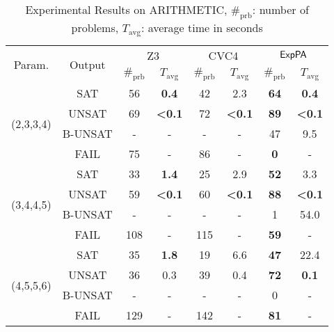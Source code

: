 
\begin{table*}[ht]
        \caption{Experimental Results on ARITHMETIC, 
    $\#_{\mathrm{prb}}$: number of problems, $T_{\mathrm{avg}}$: average time in seconds}
    \centering
    \renewcommand{\arraystretch}{1.2}
    \begin{tabular}{|c|c|c|c|c|c|c|c|}
    \hline
        \multirow{2}{*}{Param. }  & \multirow{2}{*}{Output} & \multicolumn{2}{c|}{Z3} & \multicolumn{2}{c|}{CVC4} & \multicolumn{2}{c|}{${\sf ExpPA}$} \\
        \cline{3-8}
        &  & $\#_{\mathrm{prb}}$ & $T_{\mathrm{avg}}$  & $\#_{\mathrm{prb}}$ & $T_{\mathrm{avg}}$  & $\#_{\mathrm{prb}}$ & $T_{\mathrm{avg}}$  \\ \hline
        \multirow{4}{*}{(2,3,3,4)} & SAT & 56 & {\bf 0.4} & 42 & 2.3 & {\bf 64} & {\bf 0.4} \\
        \cline{2-8}
         & UNSAT & 69 & {\bf \textless{}0.1} & 72 &  {\bf \textless{}0.1} & {\bf 89} & {\bf \textless{}0.1} \\
         \cline{2-8}
         & B-UNSAT & - & - & - & - & 47 & 9.5 \\
         \cline{2-8}
         & FAIL & 75 & - & 86 & - & {\bf 0} & - \\ \hline
         \cline{1-8}
        \multirow{4}{*}{(3,4,4,5)} & SAT & 33 & {\bf 1.4} & 25 & 2.9 & {\bf 52} & 3.3 \\
        \cline{2-8}
         & UNSAT & 59 & {\bf \textless{}0.1} & 60 & {\bf \textless{}0.1} & {\bf 88} & {\bf \textless{}0.1} \\
         \cline{2-8}
         & B-UNSAT & -  & - &  - & -  & 1 & 54.0 \\
         \cline{2-8}
         & FAIL & 108 & - & 115 & - & {\bf 59} & - \\ \hline
         \cline{1-8}
        \multirow{4}{*}{(4,5,5,6)} & SAT & 35 & {\bf 1.8} & 19 & 6.6 & {\bf 47} & 22.4 \\
        \cline{2-8}
         & UNSAT & 36 & 0.3 & 39 & 0.4 & {\bf 72} & {\bf 0.1} \\
         \cline{2-8}
         & B-UNSAT & -  & -  & - & - & 0 & - \\
         \cline{2-8}
         & FAIL & 129 & - & 142 & - & {\bf 81} & -\\
         \hline
        \end{tabular}
            \label{table:arithmetic}
\end{table*}



